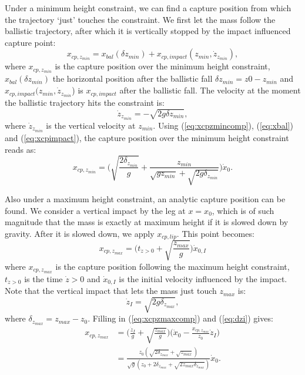 \documentclass[letterpaper, 10 pt, conference]{ieeeconf}  %
\newcommand{\zmin}{z_{min}}
\newcommand{\zmax}{z_{max}}
\begin{document}
Under a minimum height constraint, we can find a capture position from which the trajectory `just' touches the constraint. We first let the mass follow the ballistic trajectory, after which it is vertically stopped by the impact influenced capture point:
\begin{equation}
	x_{cp,\zmin} = x_{bal}(\delta \zmin) + x_{cp,impact}(\zmin, \dot{z}_{\zmin}),
	\label{eq:xcpzmincomp}
\end{equation}
where $x_{cp,\zmin}$ is the capture position over the minimum height constraint, $x_{bal}(\delta \zmin)$ the horizontal position after the ballistic fall $\delta \zmin = z0-\zmin$ and $x_{cp,impact}(\zmin,\dot{z}_{\zmin}$) is $x_{cp,impact}$ after the ballistic fall. The velocity at the moment the ballistic trajectory hits the constraint is:
\begin{equation}
	\dot{z}_{\zmin} = -\sqrt{2g\delta \zmin},
\end{equation}
where $\dot{z}_{\zmin}$ is the vertical velocity at $z_{min}$. Using (\ref{eq:xcpzmincomp}), (\ref{eq:xbal}) and (\ref{eq:xcpimpact}), the capture position over the minimum height constraint reads as:
\begin{equation}
	x_{cp,\zmin} = \Bigg(\sqrt{\frac{2\delta_{z_{min}}}{g}} + \frac{\zmin}{\sqrt{g \zmin}+\sqrt{2g\delta_{\zmin}}}\Bigg)\dot{x}_0.
\end{equation}

Also under a maximum height constraint, an analytic capture position can be found. We consider a vertical impact by the leg at $x=x_0$, which is of such magnitude that the mass is exactly at maximum height if it is slowed down by gravity. After it is slowed down, we apply $x_{cp,lip}$. This point becomes:
\begin{equation}
	x_{cp,\zmax} =\bigg(t_{\dot{z}>0} + \sqrt{\frac{\zmax}{g}}\bigg)\dot{x}_{0,I}
	\label{eq:xcpzmaxcomp}
\end{equation} 
where $x_{cp,\zmax}$ is the capture position following the maximum height constraint, $t_{\dot{z}>0}$ is the time $\dot{z}>0$ and $\dot{x}_{0,I}$ is the initial velocity influenced by the impact. Note that the vertical impact that lets the mass just touch $\zmax$ is:
\begin{equation}
	\dot{z}_{I} = \sqrt{2g\delta_{\zmax}},
	\label{eq:dzi}
\end{equation}
where $\delta_{\zmax}=\zmax-z_0$. Filling in (\ref{eq:xcpzmaxcomp}) and (\ref{eq:dzi}) gives:
\begin{align}
	x_{cp,\zmax} &= \bigg(\frac{\dot{z}_I}{g}+\sqrt{\frac{\zmax}{g}}\bigg)\bigg(\dot{x}_0-\frac{x_{cp,\zmax}}{z_0}\dot{z}_I\bigg)\\
	&=\frac{z_0(\sqrt{2\delta_{\zmax}}+\sqrt{\zmax})}{\sqrt{g}(z_0 + 2\delta_{\zmax} + \sqrt{2\zmax \delta_{\zmax}})}\dot{x}_0.
\end{align}
\end{document}
